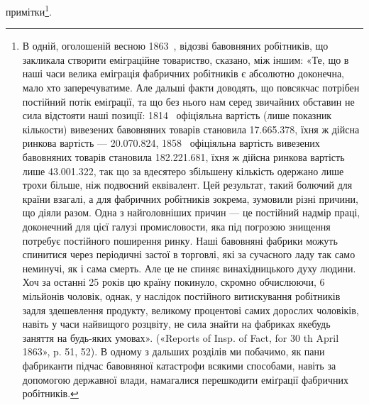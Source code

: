 примітки\footnote{
В одній, оголошеній весною 1863~, відозві бавовняних робітників,
що закликала створити еміграційне товариство, сказано, між іншим:
«Те, що в наші часи велика еміграція фабричних робітників є абсолютно
доконечна, мало хто заперечуватиме. Але дальші факти доводять, що
повсякчас потрібен постійний потік еміґрації, та що без нього нам серед
звичайних обставин не сила відстояти наші позиції: 1814~ офіціяльна
вартість (лише показник кількости) вивезених бавовняних товарів становила
\num{17.665.378}, їхня ж дійсна ринкова вартість —
\num{20.070.824}, 1858~ офіціяльна вартість вивезених бавовняних
товарів становила \num{182.221.681}, їхня ж дійсна
ринкова вартість лише \num{43.001.322}, так що за вдесятеро
збільшену кількість одержано лише трохи більше, ніж подвоєний еквівалент.
Цей результат, такий болючий для країни взагалі, а для фабричних
робітників зокрема, зумовили різні причини, що діяли разом. Одна
з найголовніших причин — це постійний надмір праці, доконечний для
цієї галузі промисловости, яка під погрозою знищення потребує постійного
поширення ринку. Наші бавовняні фабрики можуть спинитися через
періодичні застої в торговлі, які за сучасного ладу так само неминучі,
як і сама смерть. Але це не спиняє винахідницького духу людини. Хоч
за останні 25 років цю країну покинуло, скромно обчислюючи, 6 мільйонів
чоловік, однак, у наслідок постійного витискування робітників задля
здешевлення продукту, великому процентові самих дорослих чоловіків,
навіть у часи найвищого розцвіту, не сила знайти на фабриках якебудь
заняття на будь-яких умовах». («Reports of Insp. of Fact, for 30 th April
1863», p. 51, 52). В одному з дальших розділів ми побачимо, як пани
фабриканти підчас бавовняної катастрофи всякими способами, навіть за
допомогою державної влади, намагалися перешкодити еміґрації фабричних
робітників.
}.
\parbreak{}  %
